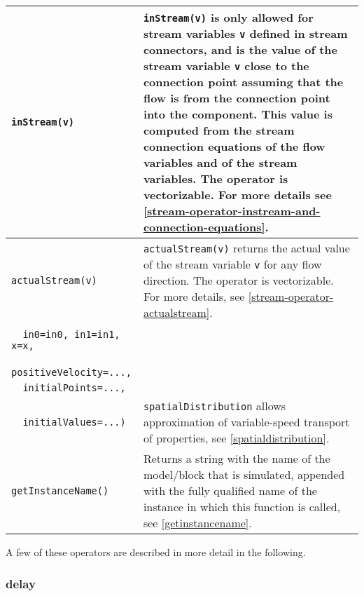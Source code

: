 \begin{longtable}{|p{5.1cm}|p{8cm}|}
\lstinline!inStream(v)! & \lstinline!inStream(v)! is only allowed for stream
variables \lstinline!v! defined in stream connectors, and is the value of the stream
variable \lstinline!v! close to the connection point assuming that the flow is from
the connection point into the component. This value is computed from the
stream connection equations of the flow variables and of the stream
variables. The operator is vectorizable. For more details see \cref{stream-operator-instream-and-connection-equations}.\\
\hline

\lstinline!actualStream(v)! & \lstinline!actualStream(v)! returns the actual value
of the stream variable \lstinline!v! for any flow direction. The operator is
vectorizable. For more details, see \cref{stream-operator-actualstream}.\\
\hline

\begin{tabular}{@{}p{5.1cm}@{}}
\lstinline!spatialDistribution(!\\
\lstinline!  in0=in0, in1=in1, x=x,!\\
\lstinline!  positiveVelocity=...,!\\
\lstinline!  initialPoints=...,!\\
\lstinline!  initialValues=...)!
\end{tabular} &
\lstinline!spatialDistribution! allows approximation of variable-speed transport of properties, see \cref{spatialdistribution}.\\
\hline

\lstinline!getInstanceName()! & Returns a string with the name of the model/block
that is simulated, appended with the fully qualified name of the
instance in which this function is called, see \cref{getinstancename}.\\
\hline
\end{longtable}

A few of these operators are described in more detail in the following.

\subsubsection{delay}\label{delay}

